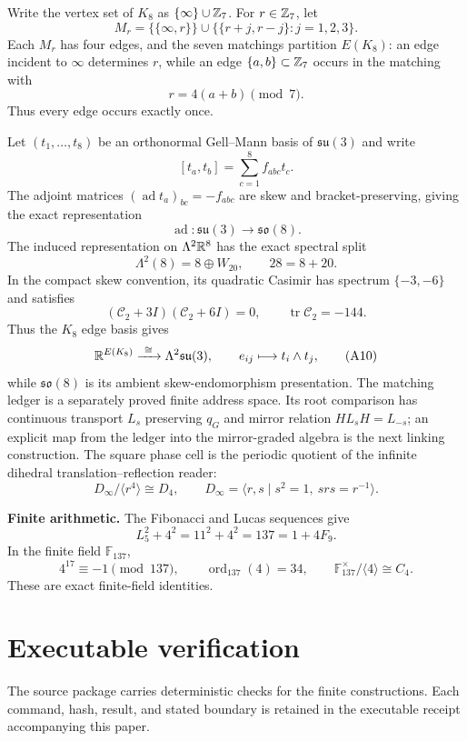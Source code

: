 Write the vertex set of $K_8$ as $\{\infty\}\cup\mathbb Z_7$.  For
$r\in\mathbb Z_7$, let
\[
M_r=\{\{\infty,r\}\}\cup
\bigl\{\{r+j,r-j\}:j=1,2,3\bigr\}.
\tag{A4}
\]
Each $M_r$ has four edges, and the seven matchings partition $E(K_8)$: an edge
incident to $\infty$ determines $r$, while an edge $\{a,b\}\subset\mathbb Z_7$
occurs in the matching with
\[
r=4(a+b)\pmod7.
\tag{A5}
\]
Thus every edge occurs exactly once.

Let $(t_1,\ldots,t_8)$ be an orthonormal Gell--Mann basis of
$\mathfrak{su}(3)$ and write
\[
[t_a,t_b]=\sum_{c=1}^8 f_{abc}t_c.
\tag{A6}
\]
The adjoint matrices $(\operatorname{ad}t_a)_{bc}=-f_{abc}$ are skew and
bracket-preserving, giving the exact representation
\[
\operatorname{ad}:\mathfrak{su}(3)\longrightarrow\mathfrak{so}(8).
\tag{A7}
\]
The induced representation on $\Lambda^2\mathbb R^8$ has the exact spectral split
\[
\Lambda^2(8)=8\oplus W_{20},
\qquad
28=8+20.
\tag{A8}
\]
In the compact skew convention, its quadratic Casimir has spectrum
$\{-3,-6\}$ and satisfies
\[
(\mathcal C_2+3I)(\mathcal C_2+6I)=0,
\qquad
\operatorname{tr}\mathcal C_2=-144.
\tag{A9}
\]
Thus the $K_8$ edge basis gives
\[
\R^{E(K_8)}\xrightarrow{\ \cong\ }\Lambda^2\mathfrak{su}(3),
\qquad e_{ij}\longmapsto t_i\wedge t_j,
\tag{A10}
\]
while $\mathfrak{so}(8)$ is its ambient skew-endomorphism presentation.  The
matching ledger is a separately proved finite address space.  Its root
comparison has continuous transport $L_s$ preserving $q_G$ and mirror relation
$HL_sH=L_{-s}$; an explicit map from the ledger into the mirror-graded algebra
is the next linking construction.  The square phase cell is the periodic
quotient of the infinite dihedral translation--reflection reader:
\[
D_\infty/\langle r^4\rangle\cong D_4,
\qquad
D_\infty=\langle r,s\mid s^2=1,\ srs=r^{-1}\rangle.
\tag{A11}
\]

\medskip
\noindent\textbf{Finite arithmetic.}  The Fibonacci and Lucas sequences give
\[
L_5^2+4^2=11^2+4^2=137=1+4F_9.
\tag{A12}
\]
In the finite field $\mathbb F_{137}$,
\[
4^{17}\equiv-1\pmod{137},\qquad
\operatorname{ord}_{137}(4)=34,\qquad
\mathbb F_{137}^{\times}/\langle4\rangle\cong C_4.
\tag{A13}
\]
These are exact finite-field identities.

\section{Executable verification}

The source package carries deterministic checks for the finite constructions.
Each command, hash, result, and stated boundary is retained in the executable
receipt accompanying this paper.


